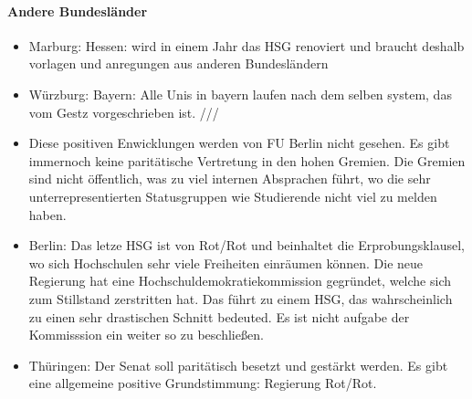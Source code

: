     \paragraph{Andere Bundesländer}
      \begin{itemize}
        \item Marburg: Hessen: wird in einem Jahr das HSG renoviert und braucht deshalb vorlagen und anregungen aus anderen Bundesländern
        \item Würzburg: Bayern: Alle Unis in bayern laufen nach dem selben system, das vom Gestz vorgeschrieben ist. ///
        \item Diese positiven Enwicklungen werden von FU Berlin nicht gesehen. Es gibt immernoch keine paritätische Vertretung in den hohen Gremien. Die Gremien sind nicht öffentlich, was zu viel internen Absprachen führt, wo die sehr unterrepresentierten Statusgruppen wie Studierende nicht viel zu melden haben.
        \item Berlin: Das letze HSG ist von Rot/Rot und beinhaltet die Erprobungsklausel, wo sich Hochschulen sehr viele Freiheiten einräumen können. Die neue Regierung hat eine Hochschuldemokratiekommission gegründet, welche sich zum Stillstand zerstritten hat. Das führt zu einem HSG, das wahrscheinlich zu einen sehr drastischen Schnitt bedeuted. Es ist nicht aufgabe der Kommisssion ein weiter so zu beschließen.
        \item Thüringen: Der Senat soll paritätisch besetzt und gestärkt werden. Es gibt eine allgemeine positive Grundstimmung: Regierung Rot/Rot.
      \end{itemize}

